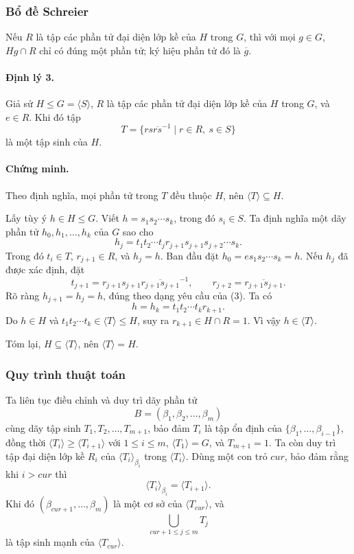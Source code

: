 \documentclass[11pt]{article}
\begin{document}
\subsubsection{Bổ đề Schreier}

Nếu \(R\) là tập các phần tử đại diện lớp kề của \(H\) trong \(G\), thì với mọi
\(g\in G\), \(Hg\cap R\) chỉ có đúng một phần tử; ký hiệu phần tử đó là
\(\overline{g}\).

\paragraph{Định lý 3.}
Giả sử \(H\le G=\langle S\rangle\), \(R\) là tập các phần tử đại diện lớp kề
của \(H\) trong \(G\), và \(e\in R\). Khi đó tập
\[
  T=\{rs\overline{rs}^{-1}\mid r\in R,\ s\in S\}
\]
là một tập sinh của \(H\).

\paragraph{Chứng minh.}
Theo định nghĩa, mọi phần tử trong \(T\) đều thuộc \(H\), nên
\(\langle T\rangle\subseteq H\).

Lấy tùy ý \(h\in H\le G\). Viết \(h=s_1s_2\cdots s_k\), trong đó \(s_i\in S\).
Ta định nghĩa một dãy phần tử \(h_0,h_1,\ldots,h_k\) của \(G\) sao cho
\[
  h_j=t_1t_2\cdots t_jr_{j+1}s_{j+1}s_{j+2}\cdots s_k. \tag{3}
\]
Trong đó \(t_i\in T\), \(r_{j+1}\in R\), và \(h_j=h\). Ban đầu đặt
\(h_0=es_1s_2\cdots s_k=h\). Nếu \(h_j\) đã được xác định, đặt
\[
  t_{j+1}=r_{j+1}s_{j+1}\overline{r_{j+1}s_{j+1}}^{-1},\qquad
  r_{j+2}=\overline{r_{j+1}s_{j+1}}.
\]
Rõ ràng \(h_{j+1}=h_j=h\), đúng theo dạng yêu cầu của (3). Ta có
\[
  h=h_k=t_1t_2\cdots t_kr_{k+1}.
\]
Do \(h\in H\) và \(t_1t_2\cdots t_k\in\langle T\rangle\le H\), suy ra
\(r_{k+1}\in H\cap R=1\). Vì vậy \(h\in\langle T\rangle\).

Tóm lại, \(H\subseteq\langle T\rangle\), nên \(\langle T\rangle=H\).

\subsubsection{Quy trình thuật toán}

Ta liên tục điều chỉnh và duy trì dãy phần tử
\[
  B=(\beta_1,\beta_2,\ldots,\beta_m)
\]
cùng dãy tập sinh \(T_1,T_2,\ldots,T_{m+1}\), bảo đảm \(T_i\) là tập ổn định của
\(\{\beta_1,\ldots,\beta_{i-1}\}\), đồng thời
\(\langle T_i\rangle\ge\langle T_{i+1}\rangle\) với \(1\le i\le m\),
\(\langle T_1\rangle=G\), và \(T_{m+1}=1\). Ta còn duy trì tập đại diện lớp kề
\(R_i\) của \(\langle T_i\rangle_{\beta_i}\) trong \(\langle T_i\rangle\). Dùng
một con trỏ \(\mathit{cur}\), bảo đảm rằng khi \(i>\mathit{cur}\) thì
\[
  \langle T_i\rangle_{\beta_i}=\langle T_{i+1}\rangle. \tag{4}
\]
Khi đó \((\beta_{\mathit{cur}+1},\ldots,\beta_m)\) là một cơ sở của
\(\langle T_{\mathit{cur}}\rangle\), và
\[
  \bigcup_{\mathit{cur}+1\le j\le m}T_j
\]
là tập sinh mạnh của \(\langle T_{\mathit{cur}}\rangle\).
\end{document}
